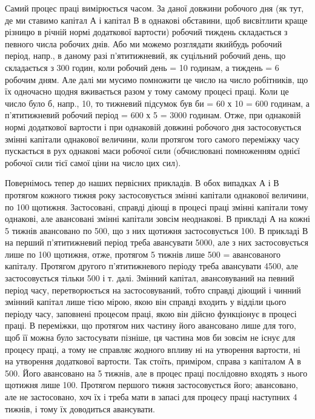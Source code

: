 Самий процес праці вимірюється часом. За даної довжини робочого
дня (як тут, де ми ставимо капітал А і капітал В в однакові обставини,
щоб висвітлити краще різницю в річній нормі додаткової вартости)
робочий тиждень складається з певного числа робочих днів. Або ми
можемо розглядати якийбудь робочий період, напр., в даному разі п’ятитижневий,
як суцільний робочий день, що складається з 300 годин, коли
робочий день = 10 годинам, а тиждень = 6 робочим дням. Але далі ми
мусимо помножити це число на число робітників, що їх одночасно щодня
вживається разом у тому самому процесі праці. Коли це число
було б, напр., 10, то тижневий підсумок був би = 60 х 10 = 600 годинам,
а п’ятитижневий робочий період = 600 х 5 = 3000 годинам. Отже,
при однаковій нормі додаткової вартости і при однаковій довжині робочого
дня застосовується змінні капітали однакової величини, коли протягом
того самого переміжку часу пускається в рух однакові маси робочої
сили (обчислювані помноженням однієї робочої сили тієї самої
ціни на число цих сил).

Повернімось тепер до наших первісних прикладів. В обох випадках
А і В протягом кожного тижня року застосовується змінні капітали
однакової величини, по 100 щотижня. Застосовані, справді діющі
в процесі праці змінні капітали тому однакові, але авансовані змінні
капітали зовсім неоднакові. В прикладі А на кожні 5 тижнів авансовано по
500, що з них щотижня застосовується 100. В прикладі
В на перший п’ятитижневий період треба авансувати 5000, але
з них застосовується лише по 100 щотижня, отже, протягом
5 тижнів лише 500 =  авансованого капіталу. Протягом
другого п’ятитижневого періоду треба авансувати 4500, але застосовується
тільки 500 і т. далі. Змінний капітал, авансовуваний
на певний період часу, перетворюється на застосовуваний, тобто справді
діющий і чинний змінний капітал лише тією мірою, якою він справді входить
у відділи цього періоду часу, заповнені процесом праці, якою він
дійсно функціонує в процесі праці. В переміжки, що протягом них
частину його авансовано лише для того, щоб її можна було застосувати
пізніше, ця частина мов би зовсім не існує для процесу праці, а тому
не справляє жодного впливу ні на утворення вартости, ні на утворення
додаткової вартости. Так стоїть, приміром, справа з капіталом А в
500. Його авансовано на 5 тижнів, але в процес праці послідовно
входять з нього щотижня лише 100. Протягом першого тижня
застосовується  його;  авансовано, але не застосовано, хоч їх і
треба мати в запасі для процесу праці наступних 4 тижнів, і тому їх
доводиться авансувати.

